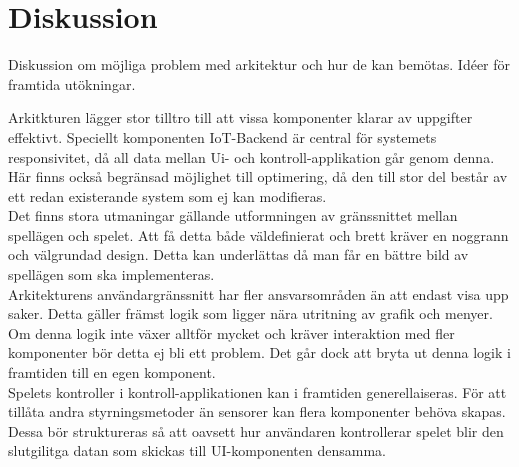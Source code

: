 \section{Diskussion}
Diskussion om möjliga problem med arkitektur och hur de kan bemötas. Idéer för framtida utökningar.

Arkitkturen lägger stor tilltro till att vissa komponenter klarar av uppgifter effektivt. Speciellt komponenten IoT-Backend är central för systemets responsivitet, då all data mellan Ui- och kontroll-applikation går genom denna. Här finns också begränsad möjlighet till optimering, då den till stor del består av ett redan existerande system som ej kan modifieras.\\

Det finns stora utmaningar gällande utformningen av gränssnittet mellan spellägen och spelet. Att få detta både väldefinierat och brett kräver en noggrann och välgrundad design. Detta kan underlättas då man får en bättre bild av spellägen som ska implementeras.\\

Arkitekturens användargränssnitt har fler ansvarsområden än att endast visa upp saker. Detta gäller främst logik som ligger nära utritning av grafik och menyer. Om denna logik inte växer alltför mycket och kräver interaktion med fler komponenter bör detta ej bli ett problem. Det går dock att bryta ut denna logik i framtiden till en egen komponent.\\

Spelets kontroller i kontroll-applikationen kan i framtiden generellaiseras. För att tillåta andra styrningsmetoder än sensorer kan flera komponenter behöva skapas. Dessa bör struktureras så att oavsett hur användaren kontrollerar spelet blir den slutgilitga datan som skickas till UI-komponenten densamma.
